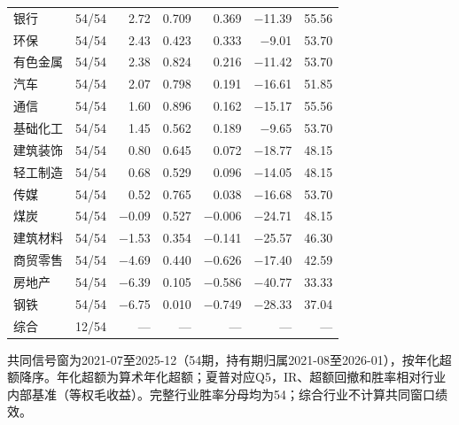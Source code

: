 \begin{longtable}{lrrrrrr}
银行 & 54/54 & 2.72 & 0.709 & 0.369 & $-$11.39 & 55.56 \\
环保 & 54/54 & 2.43 & 0.423 & 0.333 & $-$9.01 & 53.70 \\
有色金属 & 54/54 & 2.38 & 0.824 & 0.216 & $-$11.42 & 53.70 \\
汽车 & 54/54 & 2.07 & 0.798 & 0.191 & $-$16.61 & 51.85 \\
通信 & 54/54 & 1.60 & 0.896 & 0.162 & $-$15.17 & 55.56 \\
基础化工 & 54/54 & 1.45 & 0.562 & 0.189 & $-$9.65 & 53.70 \\
建筑装饰 & 54/54 & 0.80 & 0.645 & 0.072 & $-$18.77 & 48.15 \\
轻工制造 & 54/54 & 0.68 & 0.529 & 0.096 & $-$14.05 & 48.15 \\
传媒 & 54/54 & 0.52 & 0.765 & 0.038 & $-$16.68 & 53.70 \\
煤炭 & 54/54 & $-$0.09 & 0.527 & $-$0.006 & $-$24.71 & 48.15 \\
建筑材料 & 54/54 & $-$1.53 & 0.354 & $-$0.141 & $-$25.57 & 46.30 \\
商贸零售 & 54/54 & $-$4.69 & 0.440 & $-$0.626 & $-$17.40 & 42.59 \\
房地产 & 54/54 & $-$6.39 & 0.105 & $-$0.586 & $-$40.77 & 33.33 \\
钢铁 & 54/54 & $-$6.75 & 0.010 & $-$0.749 & $-$28.33 & 37.04 \\
综合 & 12/54 & --- & --- & --- & --- & --- \\
\end{longtable}
\noindent\footnotesize 共同信号窗为2021-07至2025-12（54期，持有期归属2021-08至2026-01），按年化超额降序。年化超额为算术年化超额；夏普对应Q5，IR、超额回撤和胜率相对行业内部基准（等权毛收益）。完整行业胜率分母均为54；综合行业不计算共同窗口绩效。\par
\endgroup
